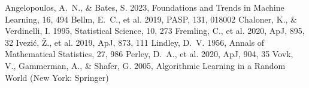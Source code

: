 \begin{thebibliography}{}
 Angelopoulos, A.~N., \& Bates, S. 2023, Foundations and Trends in Machine Learning, 16, 494
 Bellm, E.~C., et al. 2019, PASP, 131, 018002
 Chaloner, K., \& Verdinelli, I. 1995, Statistical Science, 10, 273
 Fremling, C., et al. 2020, ApJ, 895, 32
 Ivezi\'c, \v{Z}., et al. 2019, ApJ, 873, 111
 Lindley, D.~V. 1956, Annals of Mathematical Statistics, 27, 986
 Perley, D.~A., et al. 2020, ApJ, 904, 35
 Vovk, V., Gammerman, A., \& Shafer, G. 2005, Algorithmic Learning in a Random World (New York: Springer)
\end{thebibliography}


